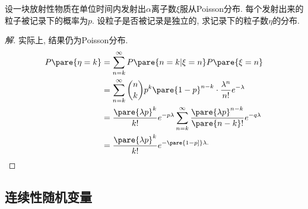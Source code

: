 \documentclass[../Statistics.tex]{subfiles}
\begin{document}
\begin{sample}
    \begin{ex}
        设一块放射性物质在单位时间内发射出$\alpha$离子数$\xi$服从Poisson分布. 每个发射出来的粒子被记录下的概率为$p$. 设粒子是否被记录是独立的, 求记录下的粒子数$\eta$的分布.
    \end{ex}
    \begin{proof}[解]
        实际上, 结果仍为Poisson分布.
        \begin{align*}
            P\pare{\eta = k} &= \sum_{n=k}^\infty P\pare{n=k\vert \xi = n}P\pare{\xi = n} \\
            &= \sum_{n=k}^\infty \binom{n}{k} p^k \pare{1-p}^{n-k} \cdot \frac{\lambda^n}{n!}e^{-\lambda} \\
            &= \frac{\pare{\lambda p}^k}{k!}e^{-p\lambda} \sum_{n=k}^\infty \frac{\pare{\lambda p}^{n-k}}{\pare{n-k}!}e^{-q\lambda} \\
            &= \frac{\pare{\lambda p}^k}{k!}e^{-\pare{1-p]}\lambda.}
        \end{align*}
    \end{proof}
\end{sample}



\subsection{连续性随机变量} %
\label{sub:连续性随机变量}
\end{document}
